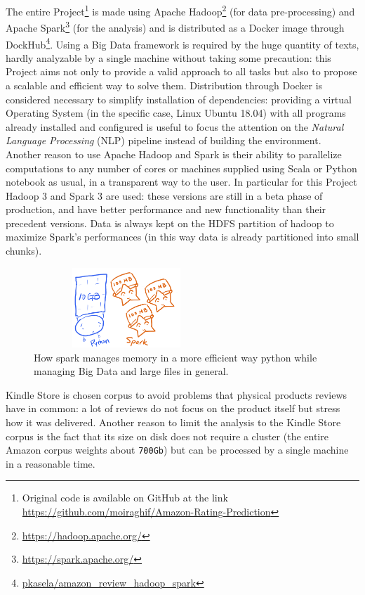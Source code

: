 \documentclass[fleqn,10pt]{SelfArx}
\begin{document}
The entire Project\footnote{Original code is available on GitHub at the link \url{https://github.com/moiraghif/Amazon-Rating-Prediction}} is made using Apache Hadoop\footnote{\url{https://hadoop.apache.org/}} (for data pre-processing) and Apache Spark\footnote{\url{https://spark.apache.org/}} (for the analysis) and is distributed as a Docker image through DockHub\footnote{\url{pkasela/amazon_review_hadoop_spark}}.
Using a Big Data framework is required by the huge quantity of texts, hardly analyzable by a single machine without taking some precaution: this Project aims not only to provide a valid approach to all tasks but also to propose a scalable and efficient way to solve them.
Distribution through Docker is considered necessary to simplify installation of dependencies: providing a virtual Operating System (in the specific case, Linux Ubuntu 18.04) with all programs already installed and configured is useful to focus the attention on the \textit{Natural Language Processing} (NLP) pipeline instead of building the environment.\newline
Another reason to use Apache Hadoop and Spark is their ability to parallelize computations to any number of cores or machines supplied using Scala or Python notebook as usual, in a transparent way to the user.
In particular for this Project Hadoop 3 and Spark 3 are used: these versions are still in a beta phase of production, and have better performance and new functionality than their precedent versions.
Data is always kept on the HDFS partition of hadoop to maximize Spark's performances (in this way data is already partitioned into small chunks).
\begin{figure}[!h]
    \centering
    \includegraphics[width=7cm, height=3cm]{pyspark-work.png}
    \caption{How spark manages memory in a more efficient way python while managing Big Data and large files in general.}
\end{figure}

Kindle Store is chosen corpus to avoid problems that physical products reviews have in common: a lot of reviews do not focus on the product itself but stress how it was delivered.
Another reason to limit the analysis to the Kindle Store corpus is the fact that its size on disk does not require a cluster (the entire Amazon corpus weights about \verb|700Gb|) but can be processed by a single machine in a reasonable time.
\end{document}
